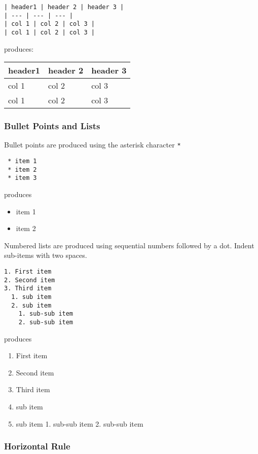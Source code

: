 \documentclass{book}
\providecommand{\tightlist}{%
      \setlength{\itemsep}{0pt}\setlength{\parskip}{0pt}}
\newcommand{\passthrough}[1]{#1}
\begin{document}
\begin{lstlisting}
| header1 | header 2 | header 3 |
| --- | --- | --- |
| col 1 | col 2 | col 3 |
| col 1 | col 2 | col 3 |
\end{lstlisting}

produces:

\begin{longtable}[]{@{}lll@{}}
\toprule
header1 & header 2 & header 3\tabularnewline
\midrule
\endhead
col 1 & col 2 & col 3\tabularnewline
col 1 & col 2 & col 3\tabularnewline
\bottomrule
\end{longtable}

\hypertarget{bullet-points-and-lists}{%
\subsubsection{Bullet Points and Lists}\label{bullet-points-and-lists}}

Bullet points are produced using the asterisk character
\passthrough{\lstinline!*!}

\begin{lstlisting}
 * item 1
 * item 2
 * item 3
\end{lstlisting}

produces

\begin{itemize}
\tightlist
\item
  item 1
\item
  item 2
\end{itemize}

Numbered lists are produced using sequential numbers followed by a dot.
Indent sub-items with two spaces.

\begin{lstlisting}
1. First item
2. Second item
3. Third item
  1. sub item
  2. sub item
    1. sub-sub item
    2. sub-sub item
\end{lstlisting}

produces

\begin{enumerate}
\def\labelenumi{\arabic{enumi}.}
\tightlist
\item
  First item
\item
  Second item
\item
  Third item
\item
  sub item
\item
  sub item 1. sub-sub item 2. sub-sub item
\end{enumerate}

\hypertarget{horizontal-rule}{%
\subsubsection{Horizontal Rule}\label{horizontal-rule}}
\end{document}
